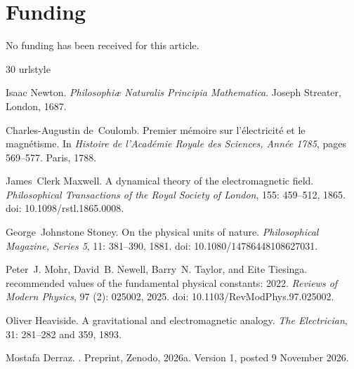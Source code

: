 \documentclass[11pt,a4paper]{article}
\theoremstyle{plain}
\theoremstyle{definition}
\theoremstyle{remark}
\begin{document}
\section*{Funding}
No funding has been received for this article.

\begin{thebibliography}{30}
\providecommand{\natexlab}[1]{#1}
\providecommand{\url}[1]{\texttt{#1}}
\expandafter\ifx\csname urlstyle\endcsname\relax
  \providecommand{\doi}[1]{doi: #1}\else
  \providecommand{\doi}{doi: \begingroup \urlstyle{rm}\Url}\fi

Isaac Newton.
\newblock \emph{Philosophi{\ae} Naturalis Principia Mathematica}.
\newblock Joseph Streater, London, 1687.

Charles-Augustin de~Coulomb.
\newblock Premier m{\'e}moire sur l'{\'e}lectricit{\'e} et le magn{\'e}tisme.
\newblock In \emph{Histoire de l'Acad{\'e}mie Royale des Sciences, Ann{\'e}e
  1785}, pages 569--577. Paris, 1788.

James~Clerk Maxwell.
\newblock A dynamical theory of the electromagnetic field.
\newblock \emph{Philosophical Transactions of the Royal Society of London},
  155: 459--512, 1865.
\newblock \doi{10.1098/rstl.1865.0008}.

George~Johnstone Stoney.
\newblock On the physical units of nature.
\newblock \emph{Philosophical Magazine, Series 5}, 11: 381--390, 1881.
\newblock \doi{10.1080/14786448108627031}.

Peter~J. Mohr, David~B. Newell, Barry~N. Taylor, and Eite Tiesinga.
 recommended values of the fundamental physical constants:
  2022.
\newblock \emph{Reviews of Modern Physics}, 97 (2): 025002,
  2025.
\newblock \doi{10.1103/RevModPhys.97.025002}.

Oliver Heaviside.
\newblock A gravitational and electromagnetic analogy.
\newblock \emph{The Electrician}, 31: 281--282 and 359, 1893.

\bibitem[Derraz(2026{\natexlab{a}})]{DerrazGN2026}
Mostafa Derraz.
.
\newblock Preprint, Zenodo, 2026{\natexlab{a}}.
\newblock Version 1, posted 9 November 2026.


\end{thebibliography}
\end{document}
